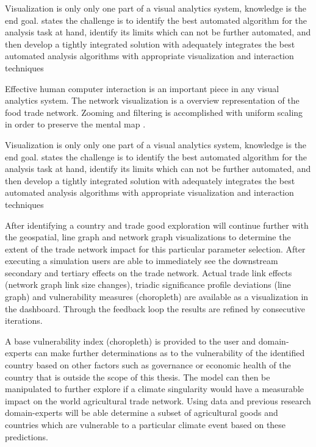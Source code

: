 Visualization is only only one part of a visual analytics system, knowledge is the end goal. \cite{keim2008visual} states the challenge is to identify the best automated algorithm for the analysis task at hand, identify its limits which can not be further automated, and then develop a tightly integrated solution with adequately integrates the best automated analysis algorithms with appropriate visualization and interaction techniques\par




Effective human computer interaction is an important piece in any visual analytics system. The network visualization is a overview representation of the food trade network. Zooming and filtering is accomplished with uniform scaling in order to preserve the mental map \citep{eades1991preserving}.



Visualization is only only one part of a visual analytics system, knowledge is the end goal. \cite{keim2008visual} states the challenge is to identify the best automated algorithm for the analysis task at hand, identify its limits which can not be further automated, and then develop a tightly integrated solution with adequately integrates the best automated analysis algorithms with appropriate visualization and interaction techniques\par













	After identifying a country and trade good exploration will continue further with the geospatial, line graph and network graph visualizations to determine the extent of the trade network impact for this particular parameter selection. After executing a simulation users are able to immediately see the downstream secondary and tertiary effects on the trade network. Actual trade link effects (network graph link size changes), triadic significance profile deviations (line graph) and vulnerability measures (choropleth) are available as a visualization in the dashboard. Through the feedback loop \citep{keim2006challenges} the results are refined by consecutive iterations.\par



	A base vulnerability index (choropleth) is provided to the user and domain-experts can make further determinations as to the vulnerability of the identified country based on other factors such as governance or economic health of the country that is outside the scope of this thesis. The model can then be manipulated to further explore if a climate singularity would have a measurable impact on the world agricultural trade network. Using data and previous research domain-experts will be able determine a subset of agricultural goods and countries which are vulnerable to a particular climate event based on these predictions.\par
